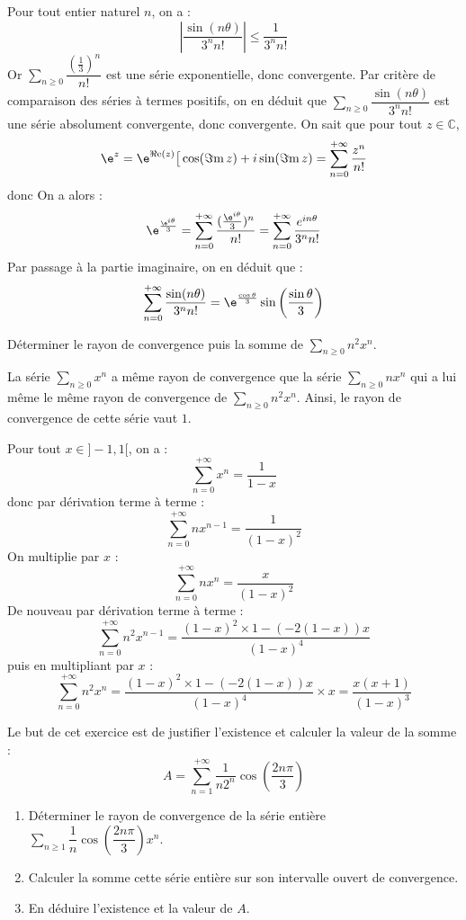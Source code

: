 \documentclass[a4paper,10pt]{report}
\newcommand{\Sum}[2]{\ensuremath{\textstyle{\sum\limits_{#1}^{#2}}}}
\begin{document}
\corr Pour tout entier naturel $n$, on a : 
\[
\left\vert\dfrac{\sin(n\theta)}{3^n n!}\right\vert\leq \dfrac{1}{3^n n!}
\]
Or $\Sum{n \geq 0}{} \dfrac{(\frac{1}{3})^n}{ n!}$ est une série exponentielle, donc convergente. Par critère de comparaison des séries à termes positifs, on en déduit que $\Sum{n \geq 0}{} \dfrac{\sin(n\theta)}{3^n n!}$ est une série absolument convergente, donc convergente. On sait que pour tout $z \in \mathbb{C}$,
$$\e^{z}=\e^{\Re\mathrm{e}(z)}\big[\cos(\Im\mathrm{m}\,z)+i\sin(\Im\mathrm{m}\,z)= \sum_{n =0}^{+ \infty} \dfrac{z^n}{n!}$$
donc 
On a alors : 
$$ \e^{\frac{\e^{i\theta}}{3}}= \sum_{n=0}^{+\infty}\dfrac{(\frac{\e^{i\theta}}{3})^n}{n!} = \sum_{n=0}^{+ \infty} \dfrac{e^{i n \theta}}{3^n n!}$$
Par passage à la partie imaginaire, on en déduit que :
$$ \sum_{n=0}^{+\infty}\dfrac{\sin(n\theta)}{3^nn!} = \e^{\frac{\cos\theta}{3}}\sin\left(\dfrac{\sin\theta}{3}\right)$$

\begin{Exercice}{} Déterminer le rayon de convergence puis la somme de $\Sum{n \geq 0}{} n^2x^n$.
\end{Exercice}

\corr La série $\Sum{n \geq 0}{} x^n$ a même rayon de convergence que  la série $\Sum{n \geq 0}{} nx^n$ qui a lui même le même rayon de convergence de $\Sum{n \geq 0}{} n^2x^n$. Ainsi, le rayon de convergence de cette série vaut $1$.

\medskip

\noindent Pour tout $x \in ]-1,1[$, on a :
$$ \sum_{n=0}^{+\infty}x^n  =  \dfrac{1}{1-x} $$
donc par dérivation terme à terme :
$$ \sum_{n=0}^{+\infty} nx^{n-1}  =  \dfrac{1}{(1-x)^2} $$
On multiplie par $x$ :
$$ \sum_{n=0}^{+\infty} nx^{n}  =  \dfrac{x}{(1-x)^2} $$
De nouveau par dérivation terme à terme :
$$ \sum_{n=0}^{+\infty} n^2 x^{n-1} = \dfrac{(1-x)^2\times 1-(-2(1-x))x}{(1-x)^4}$$
puis en multipliant par $x$ :
$$ \sum_{n=0}^{+\infty} n^2 x^{n}= \dfrac{(1-x)^2\times 1-(-2(1-x))x}{(1-x)^4} \times x  = \dfrac{x(x+1)}{(1-x)^3}$$

\begin{Exercice}{} Le but de cet exercice est de justifier l'existence et calculer la valeur de la somme :  
\[
A=\sum_{n=1}^{+\infty}\dfrac{1}{n2^n}\cos\left(\dfrac{2n\pi}{3}\right)
\]
\begin{enumerate}
\item Déterminer le rayon de convergence de la série entière $\Sum{n \geq 1}{} \dfrac{1}{n}\cos\left(\dfrac{2n\pi}{3}\right)x^n$.
\item Calculer la somme cette série entière sur son intervalle ouvert de convergence.
\item En déduire l'existence et la valeur de $A$.
\end{enumerate}
\end{Exercice}
\end{document}
